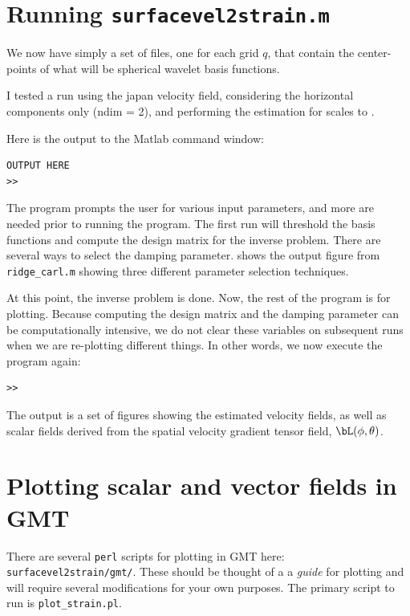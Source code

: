 \documentclass[11pt,titlepage,fleqn]{article}
\begin{document}

\section{Running {\tt surfacevel2strain.m}}

We now have simply a set of files, one for each grid $q$, that contain the center-points of what will be spherical wavelet basis functions.

I tested a run using the japan velocity field, considering the horizontal components only (ndim = 2), and performing the estimation for scales  to .

Here is the output to the Matlab command window:
%
\begin{spacing}{1.0}
\begin{verbatim}
OUTPUT HERE
>>
\end{verbatim}
\end{spacing}
%
The program prompts the user for various input parameters, and more are needed prior to running the program.  The first run will threshold the basis functions and compute the design matrix for the inverse problem.  There are several ways to select the damping parameter.  shows the output figure from \verb+ridge_carl.m+ showing three different parameter selection techniques.

At this point, the inverse problem is done.  Now, the rest of the program is for plotting.  Because computing the design matrix and the damping parameter can be computationally intensive, we do not clear these variables on subsequent runs when we are re-plotting different things.  In other words, we now execute the program again:
%
\begin{spacing}{1.0}
\begin{verbatim}
>>
\end{verbatim}
\end{spacing}
%
The output is a set of figures showing the estimated velocity fields, as well as scalar fields derived from the spatial velocity gradient tensor field, $\bL(\phi, \theta)$.


\section*{Plotting scalar and vector fields in GMT}

There are several \verb+perl+ scripts for plotting in GMT here:
%
\verb+surfacevel2strain/gmt/+.
%
These should be thought of a a {\em guide} for plotting and will require several modifications for your own purposes.  The primary script to run is \verb+plot_strain.pl+.
\end{document}
